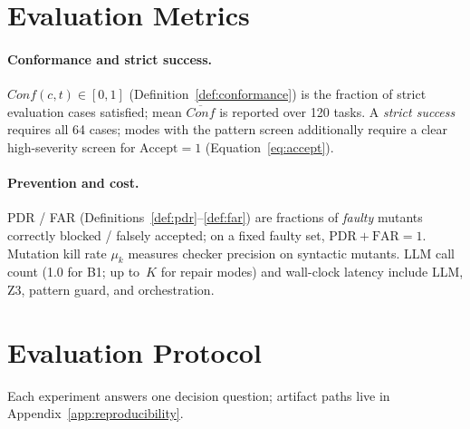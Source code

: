 \section{Evaluation Metrics}
\label{sec:exp:metrics}

\paragraph{Conformance and strict success.}
$\mathit{Conf}(c,t)\in[0,1]$ (Definition~\ref{def:conformance}) is the fraction
of strict evaluation cases satisfied; mean $\overline{\mathit{Conf}}$ is
reported over 120 tasks.
A \emph{strict success} requires all 64  cases;
modes with the pattern screen additionally require a clear high-severity
screen for $\mathrm{Accept}{=}1$ (Equation~\eqref{eq:accept}).

\paragraph{Prevention and cost.}
PDR / FAR (Definitions~\ref{def:pdr}--\ref{def:far}) are fractions of
\emph{faulty} mutants correctly blocked / falsely accepted;
on a fixed faulty set, $\mathrm{PDR}+\mathrm{FAR}=1$.
Mutation kill rate $\mu_k$ measures checker precision on syntactic mutants.
LLM call count (1.0 for B1; up to~$K$ for repair modes) and wall-clock
latency include LLM, Z3, pattern guard, and orchestration.

\section{Evaluation Protocol}
\label{sec:exp:eval-protocol}

Each experiment answers one decision question; artifact paths live in
Appendix~\ref{app:reproducibility}.


